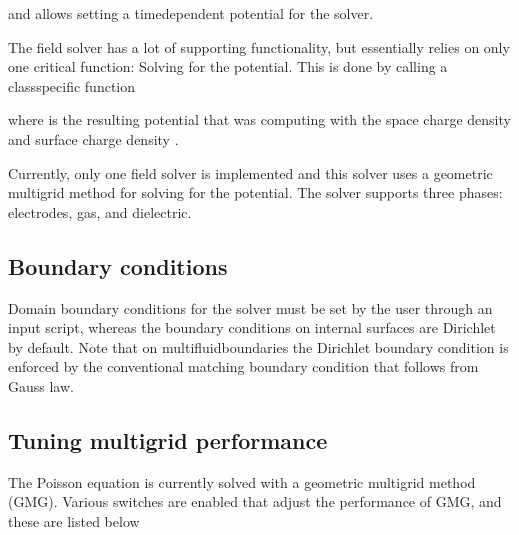 \documentclass[letterpaper,10pt,english]{sphinxmanual}
\begin{document}
and allows setting a time\sphinxhyphen{}dependent potential for the solver.

The  field solver has a lot of supporting functionality, but essentially relies on only one critical function:
Solving for the potential.
This is done by calling a class\sphinxhyphen{}specific function

\begin{sphinxVerbatim}[commandchars=\\\{\},formatcom=\scriptsize]
        
\end{sphinxVerbatim}

where  is the resulting potential that was computing with the space charge density  and surface charge density .

Currently, only one field solver is implemented and this solver uses a geometric multigrid method for solving for the potential.
The solver supports three phases: electrodes, gas, and dielectric.


\subsection{Boundary conditions}
\label{\detokenize{Poisson:boundary-conditions}}
Domain boundary conditions for the solver must be set by the user through an input script, whereas the boundary conditions on internal surfaces are Dirichlet by default.
Note that on multifluid\sphinxhyphen{}boundaries the Dirichlet boundary condition is enforced by the conventional matching boundary condition that follows from Gauss\textasciigrave{} law.


\subsection{Tuning multigrid performance}
\label{\detokenize{Poisson:tuning-multigrid-performance}}
The Poisson equation is currently solved with a geometric multigrid method (GMG).
Various switches are enabled that adjust the performance of GMG, and these are listed below
\end{document}
